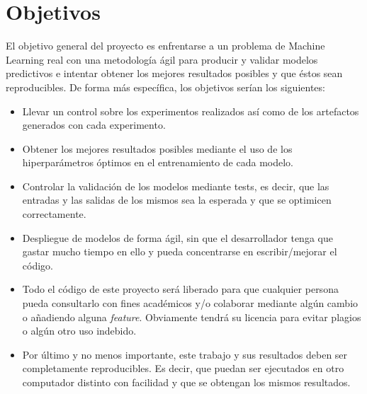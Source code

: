 \chapter{Objetivos}

El objetivo general del proyecto es enfrentarse a un problema de Machine Learning real con una metodología ágil para producir y validar modelos predictivos e intentar obtener los mejores resultados posibles y que éstos sean reproducibles. De forma más específica, los objetivos serían los siguientes:

\begin{itemize}
	\item Llevar un control sobre los experimentos realizados así como de los artefactos generados con cada experimento.
	\item Obtener los mejores resultados posibles mediante el uso de los hiperparámetros óptimos en el entrenamiento de cada modelo.
	\item Controlar la validación de los modelos mediante tests, es decir, que las entradas y las salidas de los mismos sea la esperada y que se optimicen correctamente.
	\item Despliegue de modelos de forma ágil, sin que el desarrollador tenga que gastar mucho tiempo en ello y pueda concentrarse en escribir/mejorar el código.
	\item Todo el código de este proyecto será liberado para que cualquier persona pueda consultarlo con fines académicos y/o colaborar mediante algún cambio o añadiendo alguna \textit{feature}. Obviamente tendrá su licencia para evitar plagios o algún otro uso indebido.
	\item Por último y no menos importante, este trabajo y sus resultados deben ser completamente reproducibles. Es decir, que puedan ser ejecutados en otro computador distinto con facilidad y que se obtengan los mismos resultados.
\end{itemize}